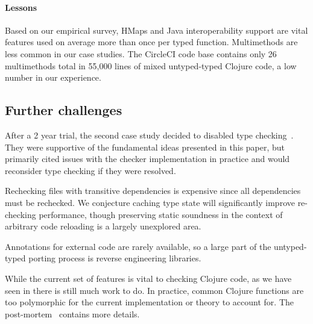 \paragraph{Lessons}
Based on our empirical survey, HMaps and Java interoperability support
are vital features used on average more than once per typed
function. 
%
Multimethods are less common
in our case studies. The CircleCI code base contains only 26 multimethods total
in 55,000 lines of mixed untyped-typed Clojure code,
a low number in our experience.


%

\subsection{Further challenges}
\label{sec:limitations}

After a 2 year trial, the second case study decided to disabled type checking~\cite{CircleCIBlog}.
They were supportive of the fundamental ideas presented in this paper, but primarily
cited issues with the checker implementation in practice and would reconsider
type checking if they were resolved.

Rechecking files with transitive dependencies is expensive since all dependencies must be rechecked.
We conjecture caching type state will significantly
improve re-checking performance,
though preserving static soundness in the context of arbitrary code reloading is a largely unexplored area.

Annotations for external code are rarely available, so a large part of the
untyped-typed porting process is reverse engineering libraries.

While the current set of features is vital to checking Clojure code, as we have seen
in  there is still much work to do.
In practice, common Clojure functions are too polymorphic for the current implementation
or theory to account for. The post-mortem~\cite{CircleCIBlog} contains more details.

